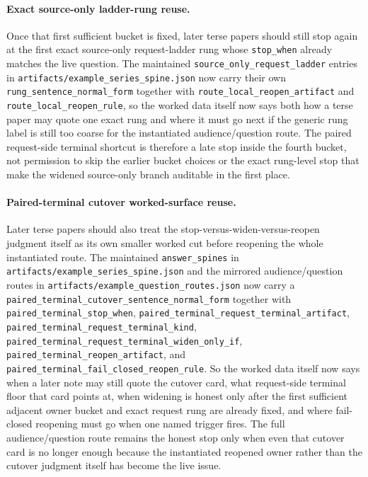 \documentclass[11pt]{article}
\begin{document}
\paragraph{Exact source-only ladder-rung reuse.}
Once that first sufficient bucket is fixed, later terse papers should still stop again at the first exact source-only request-ladder rung whose \texttt{stop\_when} already matches the live question. The maintained \texttt{source\_only\_request\_ladder} entries in \nolinkurl{artifacts/example\_series\_spine.json} now carry their own \texttt{rung\_sentence\_normal\_form} together with \texttt{route\_local\_reopen\_artifact} and \texttt{route\_local\_reopen\_rule}, so the worked data itself now says both how a terse paper may quote one exact rung and where it must go next if the generic rung label is still too coarse for the instantiated audience/question route. The paired request-side terminal shortcut is therefore a late stop inside the fourth bucket, not permission to skip the earlier bucket choices or the exact rung-level stop that make the widened source-only branch auditable in the first place.\cite{series:seriesspines}

\paragraph{Paired-terminal cutover worked-surface reuse.}
Later terse papers should also treat the stop-versus-widen-versus-reopen judgment itself as its own smaller worked cut before reopening the whole instantiated route. The maintained \texttt{answer\_spines} in \nolinkurl{artifacts/example\_series\_spine.json} and the mirrored audience/question routes in \nolinkurl{artifacts/example\_question\_routes.json} now carry a \texttt{paired\_terminal\_cutover\_sentence\_normal\_form} together with \texttt{paired\_terminal\_stop\_when}, \texttt{paired\_terminal\_request\_terminal\_artifact}, \texttt{paired\_terminal\_request\_terminal\_kind}, \texttt{paired\_terminal\_request\_terminal\_widen\_only\_if}, \texttt{paired\_terminal\_reopen\_artifact}, and \texttt{paired\_terminal\_fail\_closed\_reopen\_rule}. So the worked data itself now says when a later note may still quote the cutover card, what request-side terminal floor that card points at, when widening is honest only after the first sufficient adjacent owner bucket and exact request rung are already fixed, and where fail-closed reopening must go when one named trigger fires. The full audience/question route remains the honest stop only when even that cutover card is no longer enough because the instantiated reopened owner rather than the cutover judgment itself has become the live issue.\cite{series:pairedterminalcutoverrules,series:workedexample}
\end{document}
